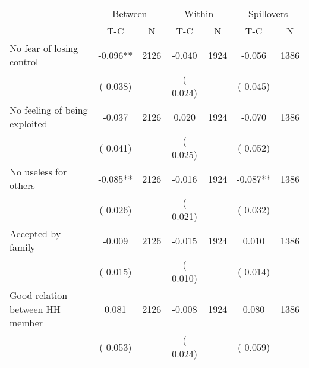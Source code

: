 
\begin{tabular}{l*{6}{c}}\hline&\multicolumn{2}{c}{Between}&\multicolumn{2}{c}{Within}&\multicolumn{2}{c}{Spillovers} \\ \cmidrule(r){2-3}\cmidrule(l){4-5}\cmidrule(l){6-7} & {T-C} & {N} & {T-C} & {N}  & {T-C}  & {N}  \\ \midrule
No fear of losing control        &             -0.096**      &       2126       &             -0.040      &       1924       &             -0.056      &       1386       \\
                       &       (       0.038)            &                               &       (       0.024)            &                               &       (       0.045)            &                               \\
No feeling of being exploited        &             -0.037      &       2126       &              0.020      &       1924       &             -0.070      &       1386       \\
                       &       (       0.041)            &                               &       (       0.025)            &                               &       (       0.052)            &                               \\
No useless for others        &             -0.085**      &       2126       &             -0.016      &       1924       &             -0.087**      &       1386       \\
                       &       (       0.026)            &                               &       (       0.021)            &                               &       (       0.032)            &                               \\
Accepted by family        &             -0.009      &       2126       &             -0.015      &       1924       &              0.010      &       1386       \\
                       &       (       0.015)            &                               &       (       0.010)            &                               &       (       0.014)            &                               \\
Good relation between HH member        &              0.081      &       2126       &             -0.008      &       1924       &              0.080      &       1386       \\
                       &       (       0.053)            &                               &       (       0.024)            &                               &       (       0.059)            &                               \\

\end{tabular}
